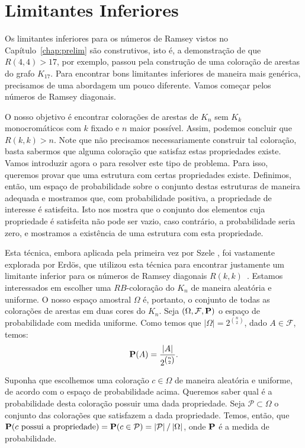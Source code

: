 
\section{Limitantes Inferiores}

Os limitantes inferiores para os números de Ramsey vistos no Capítulo~\ref{chap:prelim} são construtivos, isto é, a demonstração de que $R(4,4) > 17$, por exemplo, passou pela construção de uma coloração de arestas do grafo $K_{17}$. Para encontrar bons limitantes inferiores de maneira mais genérica, precisamos de uma abordagem um pouco diferente. Vamos começar pelos números de Ramsey diagonais.

O nosso objetivo é encontrar colorações de arestas de $K_n$ sem $K_k$ monocromáticos com $k$ fixado e $n$ maior possível. Assim, podemos concluir que $R(k,k) > n$. Note que não precisamos necessariamente construir tal coloração, basta sabermos que alguma coloração que satisfaz estas propriedades existe. Vamos introduzir agora o  para resolver este tipo de problema. Para isso, queremos provar que uma estrutura com certas propriedades existe. Definimos, então, um espaço de probabilidade sobre o conjunto destas estruturas de maneira adequada e mostramos que, com probabilidade positiva, a propriedade de interesse é satisfeita. Isto nos mostra que o conjunto dos elementos cuja propriedade é satisfeita não pode ser vazio, caso contrário, a probabilidade seria zero, e mostramos a existência de uma estrutura com esta propriedade.

Esta técnica, embora aplicada pela primeira vez por Szele \cite{szele1943kombinatorikai}, foi vastamente explorada por Erdös, que utilizou esta técnica para encontrar justamente um limitante inferior para os números de Ramsey diagonais $R(k,k)$~\cite{erdos47}. Estamos interessados em escolher uma $RB$-coloração do $K_n$ de maneira aleatória e uniforme. O nosso espaço amostral $\Omega$ é, portanto, o conjunto de todas as colorações de arestas em duas cores do $K_n$. Seja $(\Omega, \mathcal{F}, \operatorname{\mathbf{P}})$ o espaço de probabilidade com medida uniforme. Como temos que $|\Omega| = 2^{\binom{n}{2}}$, dado $A \in \mathcal{F}$, temos:
\[ \operatorname{\mathbf{P}}(A) = \frac{|A|}{2^{\binom{n}{2}}}.\]

Suponha que escolhemos uma coloração $c \in \Omega$ de maneira aleatória e uniforme, de acordo com o espaço de probabilidade acima. Queremos saber qual é a probabilidade desta coloração possuir uma dada propriedade. Seja $\mathcal{P} \subset \Omega$ o conjunto das colorações que satisfazem a dada propriedade. Temos, então, que $\operatorname{\mathbf{P}}(c \text{ possui a propriedade}) = \operatorname{\mathbf{P}}(c \in \mathcal{P}) = \left | \mathcal{P} \right | / \left | \Omega \right |$, onde $\operatorname{\mathbf{P}}$ é a medida de probabilidade.

